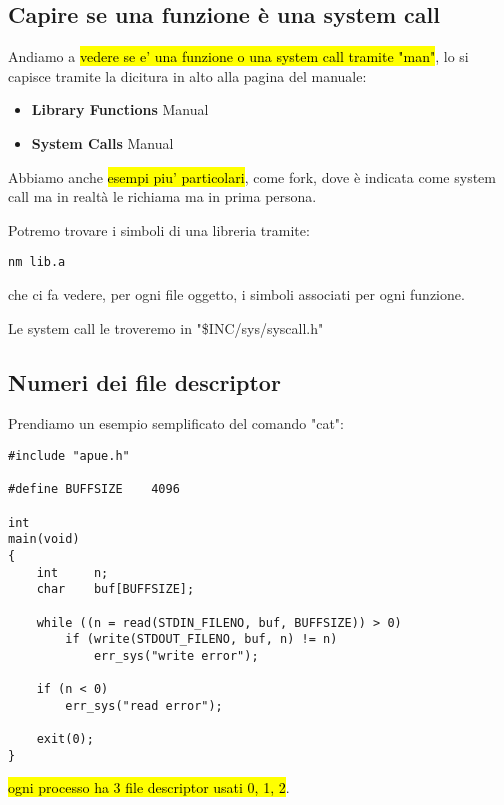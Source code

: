 \subsection{Capire se una funzione è una system call}

Andiamo a \hl{vedere se e' una funzione o una system call tramite "man"}, lo si capisce tramite la dicitura in alto alla pagina del manuale:

	\begin{itemize}
		\item \textbf{Library Functions} Manual
		\item \textbf{System Calls} Manual
	\end{itemize}

Abbiamo anche \hl{esempi piu' particolari}, come fork, dove è indicata come system call ma in realtà le richiama ma in prima persona.


Potremo trovare i simboli di una libreria tramite:

\begin{lstlisting}
nm lib.a
\end{lstlisting}

che ci fa vedere, per ogni file oggetto, i simboli associati per ogni funzione.

Le system call le troveremo in "\$INC/sys/syscall.h"


\subsection{Numeri dei file descriptor}

Prendiamo un esempio semplificato del comando "cat":

\begin{lstlisting}
#include "apue.h"

#define	BUFFSIZE	4096

int
main(void)
{
	int		n;
	char	buf[BUFFSIZE];

	while ((n = read(STDIN_FILENO, buf, BUFFSIZE)) > 0)
		if (write(STDOUT_FILENO, buf, n) != n)
			err_sys("write error");

	if (n < 0)
		err_sys("read error");

	exit(0);
}
\end{lstlisting}

\hl{ogni processo ha 3 file descriptor usati 0, 1, 2}.

